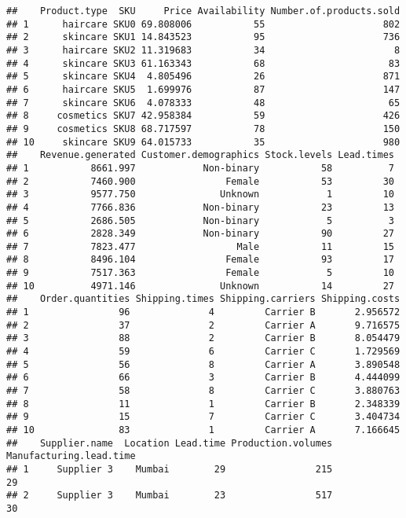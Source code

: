 \documentclass[
]{article}
\begin{document}
\begin{verbatim}
##    Product.type  SKU     Price Availability Number.of.products.sold
## 1      haircare SKU0 69.808006           55                     802
## 2      skincare SKU1 14.843523           95                     736
## 3      haircare SKU2 11.319683           34                       8
## 4      skincare SKU3 61.163343           68                      83
## 5      skincare SKU4  4.805496           26                     871
## 6      haircare SKU5  1.699976           87                     147
## 7      skincare SKU6  4.078333           48                      65
## 8     cosmetics SKU7 42.958384           59                     426
## 9     cosmetics SKU8 68.717597           78                     150
## 10     skincare SKU9 64.015733           35                     980
##    Revenue.generated Customer.demographics Stock.levels Lead.times
## 1           8661.997            Non-binary           58          7
## 2           7460.900                Female           53         30
## 3           9577.750               Unknown            1         10
## 4           7766.836            Non-binary           23         13
## 5           2686.505            Non-binary            5          3
## 6           2828.349            Non-binary           90         27
## 7           7823.477                  Male           11         15
## 8           8496.104                Female           93         17
## 9           7517.363                Female            5         10
## 10          4971.146               Unknown           14         27
##    Order.quantities Shipping.times Shipping.carriers Shipping.costs
## 1                96              4         Carrier B       2.956572
## 2                37              2         Carrier A       9.716575
## 3                88              2         Carrier B       8.054479
## 4                59              6         Carrier C       1.729569
## 5                56              8         Carrier A       3.890548
## 6                66              3         Carrier B       4.444099
## 7                58              8         Carrier C       3.880763
## 8                11              1         Carrier B       2.348339
## 9                15              7         Carrier C       3.404734
## 10               83              1         Carrier A       7.166645
##    Supplier.name  Location Lead.time Production.volumes Manufacturing.lead.time
## 1     Supplier 3    Mumbai        29                215                      29
## 2     Supplier 3    Mumbai        23                517                      30

\end{verbatim}
\end{document}
